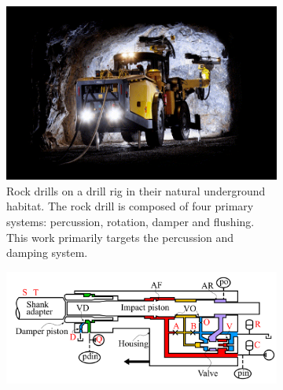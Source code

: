 \begin{figure}[!b]
    \begin{center}
        \begin{subfigure}[t]{0.38\linewidth}
        \includegraphics[width=\linewidth, trim=80 80 80 20, clip]{figures/drill_1_min.png}
        \caption{Rock drills on a drill rig in their natural underground habitat. 
        The rock drill is composed of four primary systems: percussion, rotation, damper and flushing. This work primarily targets the percussion and damping system.
        }
        \label{fig:phm_1}
    \end{subfigure}
    \hfill
    \begin{subfigure}[t]{0.6\linewidth}
        \includegraphics[width=\linewidth]{figures/drill_3.png}

\end{subfigure}
\end{center}
\end{figure}
